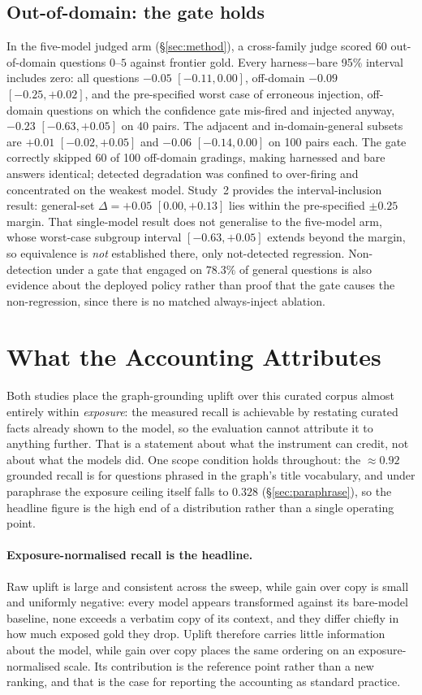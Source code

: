 \documentclass[10pt,twocolumn]{article}
\begin{document}
\subsection{Out-of-domain: the gate holds}\label{sec:ood}
In the five-model judged arm (\S\ref{sec:method}), a cross-family judge scored 60 out-of-domain questions $0$--$5$ against frontier gold. Every harness$-$bare 95\% interval includes zero: all questions $-0.05$ $[-0.11,0.00]$, off-domain $-0.09$ $[-0.25,+0.02]$, and the pre-specified worst case of erroneous injection, off-domain questions on which the confidence gate mis-fired and injected anyway, $-0.23$ $[-0.63,+0.05]$ on 40 pairs. The adjacent and in-domain-general subsets are $+0.01$ $[-0.02,+0.05]$ and $-0.06$ $[-0.14,0.00]$ on 100 pairs each. The gate correctly skipped 60 of 100 off-domain gradings, making harnessed and bare answers identical; detected degradation was confined to over-firing and concentrated on the weakest model. Study~2 provides the interval-inclusion result: general-set $\Delta=+0.05$ $[0.00,+0.13]$ lies within the pre-specified $\pm0.25$ margin. That single-model result does not generalise to the five-model arm, whose worst-case subgroup interval $[-0.63,+0.05]$ extends beyond the margin, so equivalence is \emph{not} established there, only not-detected regression. Non-detection under a gate that engaged on $78.3\%$ of general questions is also evidence about the deployed policy rather than proof that the gate causes the non-regression, since there is no matched always-inject ablation.


\section{What the Accounting Attributes}\label{sec:analysis}
Both studies place the graph-grounding uplift over this curated corpus almost entirely within \emph{exposure}: the measured recall is achievable by restating curated facts already shown to the model, so the evaluation cannot attribute it to anything further. That is a statement about what the instrument can credit, not about what the models did. One scope condition holds throughout: the $\approx0.92$ grounded recall is for questions phrased in the graph's title vocabulary, and under paraphrase the exposure ceiling itself falls to $0.328$ (\S\ref{sec:paraphrase}), so the headline figure is the high end of a distribution rather than a single operating point.

\paragraph{Exposure-normalised recall is the headline.} Raw uplift is large and consistent across the sweep, while gain over copy is small and uniformly negative: every model appears transformed against its bare-model baseline, none exceeds a verbatim copy of its context, and they differ chiefly in how much exposed gold they drop. Uplift therefore carries little information about the model, while gain over copy places the same ordering on an exposure-normalised scale. Its contribution is the reference point rather than a new ranking, and that is the case for reporting the accounting as standard practice.
\end{document}
